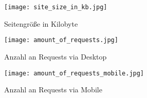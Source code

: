 		\begin{figure}[htbp]
			\begin{center}
				\texttt{[image: site\_size\_in\_kb.jpg]}
				\caption{Seitengröße in Kilobyte}
				\label{fig:site_size_in_kb}
			\end{center}
		\end{figure}

		\begin{figure}[htbp]
			\begin{center}
				\texttt{[image: amount\_of\_requests.jpg]}
				\caption{Anzahl an Requests via Desktop}
				\label{fig:amount_of_requests}
			\end{center}
		\end{figure}	

		\begin{figure}[htbp]
			\begin{center}
				\texttt{[image: amount\_of\_requests\_mobile.jpg]}
				\caption{Anzahl an Requests via Mobile}
				\label{fig:amount_of_requests_mobile}
			\end{center}
        \end{figure}
			
				


\pagebreak
